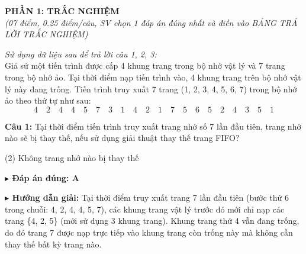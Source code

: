 \documentclass[11pt,a4paper]{article}
\newcommand{\giaithich}[2]{%
    \par\vspace{0.15cm}\noindent
    \begingroup\small
    \noindent\textbf{\color{blue}$\blacktriangleright$ Đáp án đúng: #1} \par\vspace{0.08cm}
    \noindent\textbf{\color{teal}$\blacktriangleright$ Hướng dẫn giải:} #2
    \endgroup\par\vspace{0.35cm}
}
\begin{document}
\newpage

\noindent\textbf{\large PHẦN 1: TRẮC NGHIỆM}\\
\textit{(07 điểm, 0.25 điểm/câu, SV chọn 1 đáp án đúng nhất và điền vào BẢNG TRẢ LỜI TRẮC NGHIỆM)}

\vspace{0.3cm}
\noindent\textit{Sử dụng dữ liệu sau để trả lời câu 1, 2, 3:}\\
Giả sử một tiến trình được cấp 4 khung trang trong bộ nhớ vật lý và 7 trang trong bộ nhớ ảo. Tại thời điểm nạp tiến trình vào, 4 khung trang trên bộ nhớ vật lý này đang trống. Tiến trình truy xuất 7 trang (1, 2, 3, 4, 5, 6, 7) trong bộ nhớ ảo theo thứ tự như sau:
\[ 4\quad 2\quad 4\quad 4\quad 5\quad 7\quad 3\quad 1\quad 4\quad 2\quad 1\quad 7\quad 5\quad 6\quad 5\quad 2\quad 4\quad 3\quad 5\quad 1 \]

\noindent\textbf{Câu 1:} Tại thời điểm tiến trình truy xuất trang nhớ số 7 lần đầu tiên, trang nhớ nào sẽ bị thay thế, nếu sử dụng giải thuật thay thế trang FIFO?
\begin{tasks}(2)
    \task Không trang nhớ nào bị thay thế
\end{tasks}
\giaithich{A}{Tại thời điểm truy xuất trang 7 lần đầu tiên (bước thứ 6 trong chuỗi: 4, 2, 4, 4, 5, 7), các khung trang vật lý trước đó mới chỉ nạp các trang \{4, 2, 5\} (mới sử dụng 3 khung trang). Khung trang thứ 4 vẫn đang trống, do đó trang 7 được nạp trực tiếp vào khung trang còn trống này mà không cần thay thế bất kỳ trang nào.}
\end{document}

